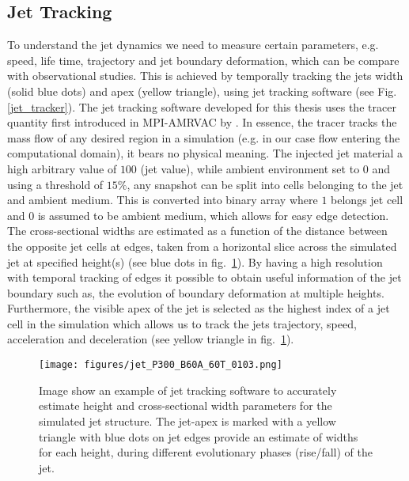 \documentclass[12pt]{ociamthesis}
\newcommand{\fref}[1]{Fig. \eqref{#1}}
\begin{document}
\subsection{Jet Tracking}
\label{subsec:jet_tracking}
To understand the jet dynamics we need to measure certain parameters, e.g. speed, life time, trajectory and jet boundary deformation, which can be compare with observational studies. This is achieved by temporally tracking the jets width (solid blue dots) and apex (yellow triangle), using jet tracking software (see \fref{jet_tracker}). The jet tracking software developed for this thesis uses the tracer quantity first introduced in MPI-AMRVAC by \cite{Porth_2014}. In essence, the tracer tracks the mass flow of any desired region in a simulation (e.g. in our case flow entering the computational domain), it bears no physical meaning. The injected jet material a high arbitrary value of $100$ (jet value), while ambient environment set to 0 and using a threshold of $15\%$, any snapshot can be split into cells belonging to the jet and ambient medium. This is converted into binary array where $1$ belongs jet cell and $0$ is assumed to be ambient medium, which allows for easy edge detection. The cross-sectional widths are estimated as a function of the distance between the opposite jet cells at edges, taken from a horizontal slice across the simulated jet at specified height(s) (see blue dots in fig.~\ref{jet_tracker}). By having a high resolution with temporal tracking of edges it possible to obtain useful information of the jet boundary such as, the evolution of boundary deformation at multiple heights. Furthermore, the visible apex of the jet is selected as the highest index of a jet cell in the simulation which allows us to track the jets trajectory, speed, acceleration and deceleration (see yellow triangle in fig.~\ref{jet_tracker}).
\begin{figure}
\centering
{\texttt{[image: figures/jet\_P300\_B60A\_60T\_0103.png]}} 
\caption{Image show an example of jet tracking software to accurately estimate height and cross-sectional width parameters for the simulated jet structure. The jet-apex is marked with a yellow triangle with blue dots on jet edges provide an estimate of widths for each height, during different evolutionary phases (rise/fall) of the jet.}
\label{jet_tracker}
\end{figure}
\end{document}
